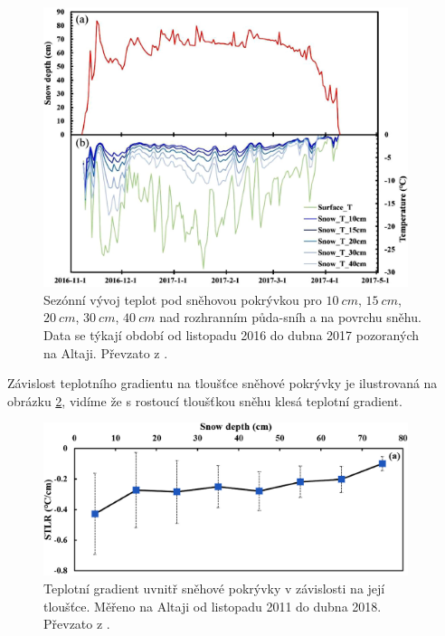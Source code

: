 \begin{figure}
	\centering
	\includegraphics[width=0.95\textwidth]{img/ch1/snowtempaltai.png}
	\caption{Sezónní vývoj teplot pod sněhovou pokrývkou pro $\SI{10}{cm}$, $\SI{15}{cm}$, $\SI{20}{cm}$, $\SI{30}{cm}$, $\SI{40}{cm}$ nad rozhranním půda-sníh a na povrchu sněhu. Data se týkají období od listopadu 2016 do dubna 2017 pozoraných na Altaji. Převzato z \cite{zhangwei2021}.}
	\label{fig:snowtempaltai}
\end{figure}

Závislost teplotního gradientu na tloušťce sněhové pokrývky je ilustrovaná na obrázku \ref{fig:snowlapserate}, vidíme že s rostoucí tloušťkou sněhu klesá teplotní gradient.

\begin{figure}
	\centering
	\includegraphics[width=0.95\textwidth]{img/ch1/snowlapserate.png}
	\caption{Teplotní gradient uvnitř sněhové pokrývky v závislosti na její tloušťce. Měřeno na Altaji od listopadu 2011 do dubna 2018. Převzato z \cite{zhangwei2021}.}
	\label{fig:snowlapserate}
\end{figure}

